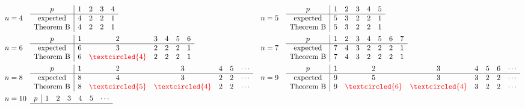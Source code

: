 \documentclass[11pt,letterpaper,reqno]{amsart}
\theoremstyle{definition}
\numberwithin{equation}{section}
\begin{document}
\begin{align*}
    & n = 4 \quad \begin{array}{c|cccccccc}
        p & 1 & 2 & 3 & 4 \\\hline
        \text{expected} & 4 & 2 & 2 & 1\\
        \text{Theorem B} & 4 & 2 & 2 & 1
    \end{array}
    && n = 5 \quad \begin{array}{c|cccccccc}
        p & 1 & 2 & 3 & 4 & 5 \\\hline
        \text{expected} & 5 & 3 & 2 & 2 & 1\\
        \text{Theorem B} & 5 & 3 & 2 & 2 & 1
    \end{array}\\
    & n = 6 \quad \begin{array}{c|cccccccc}
        p & 1 & 2 & 3 & 4 & 5 & 6 \\ \hline
        \text{expected} & 6 & 3 &2 & 2 & 2 & 1\\
        \text{Theorem B} & 6 & {\color{red} \textcircled{4}} &2 & 2 & 2 & 1
    \end{array}
    && n = 7 \quad \begin{array}{c|cccccccc}
        p & 1 & 2 & 3 & 4 & 5 & 6 & 7\\\hline
        \text{expected} & 7 & 4 & 3 & 2 & 2 & 2 & 1\\
        \text{Theorem B} & 7 & 4 & 3 & 2 & 2 & 2 & 1
    \end{array}\\
    & n = 8 \quad \begin{array}{c|cccccccc}
        p & 1 & 2 & 3 & 4 & 5 & \cdots\\\hline
        \text{expected} & 8 & 4 & 3 & 2 & 2 & \cdots\\
        \text{Theorem B} & 8 & {\color{red}\textcircled{5}} & {\color{red}\textcircled{4}} & 2 & 2 & \cdots
    \end{array}
    && n = 9 \quad \begin{array}{c|cccccccc}
        p & 1 & 2 & 3 & 4 & 5 & 6 & \cdots\\\hline
        \text{expected} & 9 & 5 & 3 & 3 & 2 & 2 & \cdots\\
        \text{Theorem B} & 9 & {\color{red}\textcircled{6}} & {\color{red}\textcircled{4}} & 3 & 2 & 2 & \cdots
    \end{array}\\
    & n = 10 \,\,\, \begin{array}{c|cccccccc}
        p & 1 & 2 & 3 & 4 & 5 & \cdots\\\hline

\end{array}
\end{align*}
\end{document}
